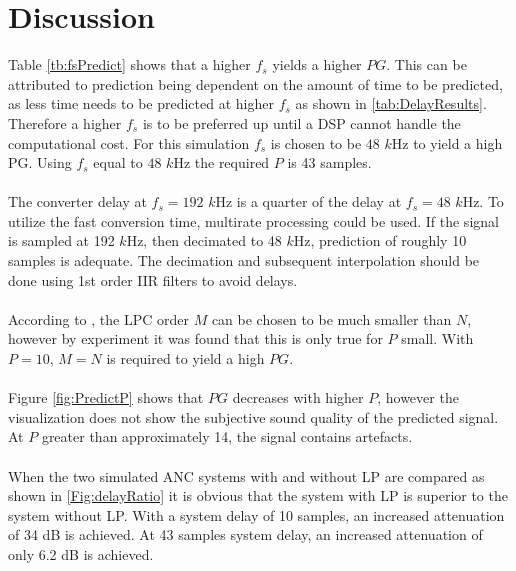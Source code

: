 \section{Discussion} \label{sec:discussion}
Table \ref{tb:fsPredict} shows that a higher $f_s$ yields a higher $PG$. This can be attributed to prediction being dependent on the amount of time to be predicted, as less time needs to be predicted at higher $f_s$ as shown in \autoref{tab:DelayResults}.  
Therefore a higher $f_s$ is to be preferred up until a DSP cannot handle the computational cost. For this simulation $f_s$ is chosen to be $48$ $k$Hz to yield a high PG. 
Using $f_s$ equal to $48$ $k$Hz the required $P$ is 43 samples.  
\\\\
The converter delay at $f_s=192$ $k$Hz is a quarter of the delay at $f_s=48$ $k$Hz. To utilize the fast conversion time, multirate processing could be used. If the signal is sampled at 192 $k$Hz, then decimated to 48 $k$Hz, prediction of roughly 10 samples is adequate. The decimation and subsequent interpolation should be done using 1st order IIR filters to avoid delays.  
\\\\
According to \cite{Speech}, the LPC order $M$ can be chosen to be much smaller than $N$, however by experiment it was found that this is only true for $P$ small. With $P=10$, $M=N$ is required to yield a high $PG$. 
\\\\
Figure \ref{fig:PredictP} shows that $PG$ decreases with higher $P$, however the visualization does not show the subjective sound quality of the predicted signal. At $P$ greater than approximately 14, the signal contains artefacts.    
\\\\
When the two simulated ANC systems with and without LP are compared as shown in \autoref{Fig:delayRatio} it is obvious that the system with LP is superior to the system without LP. With a system delay of 10 samples, an increased attenuation of 34 dB is achieved. At 43 samples system delay, an increased attenuation of only 6.2 dB is achieved. %
